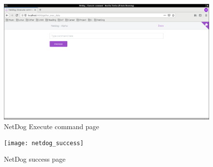 \begin{figure}[H]
\includegraphics[scale=0.3]{netdog_execute}
\caption{NetDog Execute command page}
\end{figure}

\begin{figure}[H]
\texttt{[image: netdog\_success]}
\caption{NetDog success page}
\end{figure}

